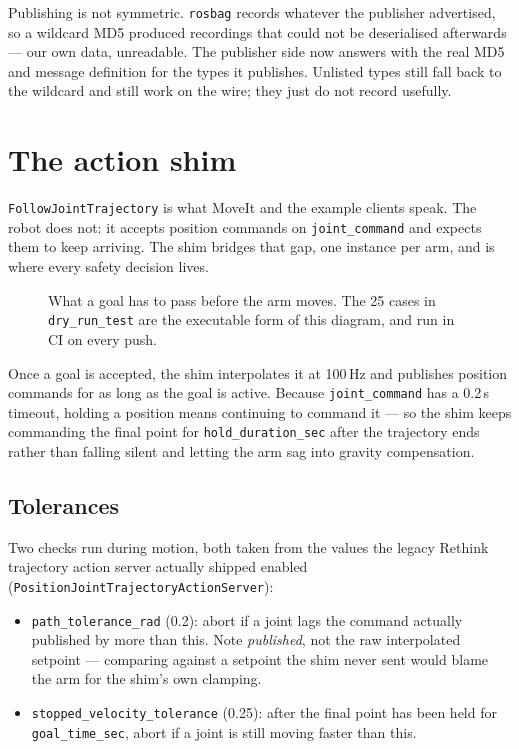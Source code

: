 Publishing is not symmetric. \texttt{rosbag} records whatever the publisher
advertised, so a wildcard MD5 produced recordings that could not be deserialised
afterwards --- our own data, unreadable. The publisher side now answers with the
real MD5 and message definition for the types it publishes. Unlisted types still
fall back to the wildcard and still work on the wire; they just do not record
usefully.

\section{The action shim}

\texttt{FollowJointTrajectory} is what MoveIt and the example clients speak. The
robot does not: it accepts position commands on \texttt{joint\_command} and
expects them to keep arriving. The shim bridges that gap, one instance per arm,
and is where every safety decision lives.

\begin{figure}[h]
\centering
\resizebox{0.92\linewidth}{!}{}
\caption{What a goal has to pass before the arm moves. The 25 cases in
\texttt{dry\_run\_test} are the executable form of this diagram, and run in CI on
every push.}
\label{fig:gate}
\end{figure}

Once a goal is accepted, the shim interpolates it at 100\,Hz and publishes
position commands for as long as the goal is active. Because
\texttt{joint\_command} has a 0.2\,s timeout, holding a position means continuing
to command it --- so the shim keeps commanding the final point for
\texttt{hold\_duration\_sec} after the trajectory ends rather than falling silent
and letting the arm sag into gravity compensation.

\subsection{Tolerances}

Two checks run during motion, both taken from the values the legacy Rethink
trajectory action server actually shipped enabled
(\texttt{PositionJoint\-Trajectory\-Action\-Server}):

\begin{itemize}
  \item \texttt{path\_tolerance\_rad} (0.2): abort if a joint lags the command
    actually published by more than this. Note \emph{published}, not the raw
    interpolated setpoint --- comparing against a setpoint the shim never sent
    would blame the arm for the shim's own clamping.
  \item \texttt{stopped\_velocity\_tolerance} (0.25): after the final point has
    been held for \texttt{goal\_time\_sec}, abort if a joint is still moving
    faster than this.
\end{itemize}

